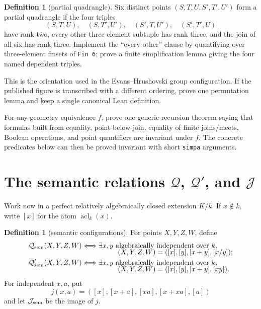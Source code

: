 \documentclass[11pt,oneside]{article}
\theoremstyle{definition}
\newtheorem{definition}[theorem]{Definition}
\theoremstyle{remark}
\newcommand{\acl}{\operatorname{acl}}
\newcommand{\Qrel}{\mathcal{Q}}
\newcommand{\Qprel}{\mathcal{Q}'}
\newcommand{\Jrel}{\mathcal{J}}
\newcommand{\lean}[1]{\nolinkurl{#1}}
\begin{document}
\begin{definition}[partial quadrangle]\label{def:partialquad}
Six distinct points $(S,T,U,S',T',U')$ form a partial quadrangle if the four triples
\[
 (S,T,U),\quad(S,T',U'),\quad(S',T,U'),\quad(S',T',U)
\]
have rank two, every other three-element subtuple has rank three, and the join of all six
has rank three.  Implement the ``every other'' clause by quantifying over
three-element finsets of \lean{Fin 6}; prove a finite simplification lemma giving the four
named dependent triples.
\end{definition}

This is the orientation used in the Evans--Hrushovski group configuration.  If the
published figure is transcribed with a different ordering, prove one permutation lemma
and keep a single canonical Lean definition.

For any geometry equivalence $f$, prove one generic recursion theorem saying that formulas
built from equality, point-below-join, equality of finite joins/meets, Boolean operations,
and point quantifiers are invariant under $f$.  The concrete predicates below can then be
proved invariant with short \lean{simpa} arguments.

\section[The semantic relations Q, Q-prime, and J]
{The semantic relations $\Qrel$, $\Qprel$, and $\Jrel$}

Work now in a perfect relatively algebraically closed extension $K/k$.  If $x\notin k$,
write $[x]$ for the atom $\acl_k(x)$.

\begin{definition}[semantic configurations]\label{def:semantic-configs}
For points $X,Y,Z,W$, define
\[
\begin{aligned}
\Qrel_{\rm sem}(X,Y,Z,W)
&\Longleftrightarrow
 \exists x,y\text{ algebraically independent over }k,\\[-2mm]
&\hspace{18mm}(X,Y,Z,W)=([x],[y],[x+y],[x/y]);\\
\Qprel_{\rm sem}(X,Y,Z,W)
&\Longleftrightarrow
 \exists x,y\text{ algebraically independent over }k,\\[-2mm]
&\hspace{18mm}(X,Y,Z,W)=([x],[y],[x+y],[xy]).
\end{aligned}
\]
For independent $x,a$, put
\[
 j(x,a)=([x],[x+a],[xa],[x+xa],[a])
\]
and let $\Jrel_{\rm sem}$ be the image of $j$.
\end{definition}
\end{document}
